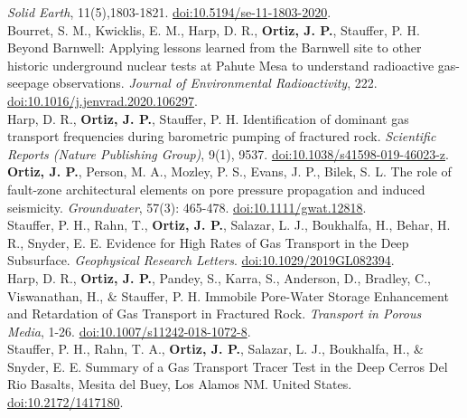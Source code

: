 \documentclass[11pt, letterpaper]{article}
\newcommand{\years}[1]{\marginnote{\scriptsize #1}}
\begin{document}
\emph{Solid Earth}, 11(5),1803-1821. 
\href{https://se.copernicus.org/articles/11/1803/2020/se-11-1803-2020.pdf}{doi:10.5194/se-11-1803-2020}.\\
%
\years{2020}Bourret, S. M., Kwicklis, E. M., Harp, D. R., \textbf{Ortiz, J.
P.}, Stauffer, P. H. Beyond Barnwell: Applying lessons learned from the
Barnwell site to other historic underground nuclear tests at Pahute Mesa to
understand radioactive gas-seepage observations. \emph{Journal of Environmental
Radioactivity}, 222. 
\href{https://www.sciencedirect.com/science/article/pii/S0265931X20300199/pdfft?md5=63166f84895846446b3a9ce93cc68c79&pid=1-s2.0-S0265931X20300199-main.pdf}{doi:10.1016/j.jenvrad.2020.106297}.\\
%
\years{2019}Harp, D. R., \textbf{Ortiz, J. P.}, Stauffer, P. H. Identification
of dominant gas transport frequencies during barometric pumping of fractured
rock. \emph{Scientific Reports (Nature Publishing Group)}, 9(1), 9537.
\href{https://www.nature.com/articles/s41598-019-46023-z.pdf}{doi:10.1038/s41598-019-46023-z}. \\ 
%
\textbf{\years{2019}}\textbf{Ortiz, J. P.}, Person,
M. A., Mozley, P. S., Evans, J. P., Bilek, S. L. The role of fault-zone
architectural elements on pore pressure propagation and induced seismicity.
\emph{Groundwater}, 57(3): 465-478. 
\href{https://ngwa.onlinelibrary.wiley.com/doi/epdf/10.1111/gwat.12818}{doi:10.1111/gwat.12818}.\\
%
\years{2019}Stauffer, P. H., Rahn, T., \textbf{Ortiz, J. P.}, Salazar, L. J.,
Boukhalfa, H., Behar, H. R., Snyder, E. E. Evidence for High Rates of Gas
Transport in the Deep Subsurface. \emph{Geophysical Research Letters}.
\href{https://agupubs.onlinelibrary.wiley.com/doi/epdf/10.1029/2019GL082394}{doi:10.1029/2019GL082394}.\\ 
%
\years{2018}Harp, D. R., \textbf{Ortiz, J. P.},
Pandey, S., Karra, S., Anderson, D., Bradley, C., Viswanathan, H., \& Stauffer,
P. H. Immobile Pore-Water Storage Enhancement and Retardation of Gas Transport
in Fractured Rock. \emph{Transport in Porous Media}, 1-26.
\href{https://link.springer.com/content/pdf/10.1007/s11242-018-1072-8.pdf}{doi:10.1007/s11242-018-1072-8}.\\ 
%
\years{2018}Stauffer, P. H., Rahn, T. A., \textbf{Ortiz, J. P.}, Salazar, L.
J., Boukhalfa, H., \& Snyder, E. E. Summary of a Gas Transport Tracer Test in
the Deep Cerros Del Rio Basalts, Mesita del Buey, Los Alamos NM. United States.
\href{https://www.osti.gov/servlets/purl/1417180}{doi:10.2172/1417180}.\\
\end{document}

